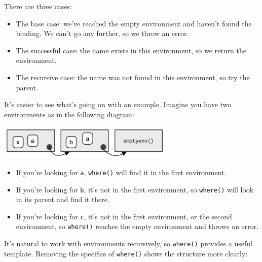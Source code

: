 There are three cases:

\begin{itemize}
\item
  The base case: we've reached the empty environment and haven't found
  the binding. We can't go any further, so we throw an error.
\item
  The successful case: the name exists in this environment, so we return
  the environment.
\item
  The recursive case: the name was not found in this environment, so try
  the parent.
\end{itemize}

It's easier to see what's going on with an example. Imagine you have two
environments as in the following diagram:

\includegraphics[width=3.32in]{diagrams/environments.png/where-ex.png}

\begin{itemize}
\item
  If you're looking for \texttt{a}, \texttt{where()} will find it in the
  first environment.
\item
  If you're looking for \texttt{b}, it's not in the first environment,
  so \texttt{where()} will look in its parent and find it there.
\item
  If you're looking for \texttt{c}, it's not in the first environment,
  or the second environment, so \texttt{where()} reaches the empty
  environment and throws an error.
\end{itemize}

It's natural to work with environments recursively, so \texttt{where()}
provides a useful template. Removing the specifics of \texttt{where()}
shows the structure more clearly:

\begin{Shaded}
\begin{Highlighting}[]
\StringTok{ } \NormalTok{()) \{}
  \NormalTok{())) \{}
     
  \NormalTok{\}}
\NormalTok{\}}
\end{Highlighting}
\end{Shaded}

